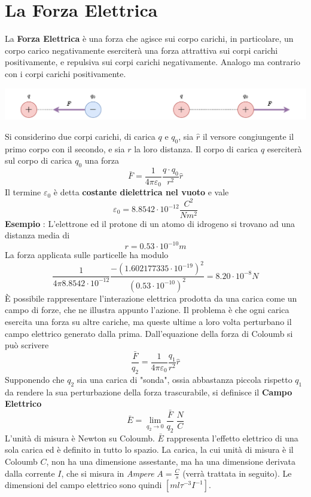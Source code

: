 \documentclass[10pt, letterpaper]{report}
\begin{document}
\section{La Forza Elettrica}
La \textbf{Forza Elettrica} è una forza che agisce sui corpo carichi, in particolare, un corpo carico negativamente eserciterà una forza attrattiva sui corpi carichi positivamente, e repulsiva sui corpi carichi negativamente. Analogo ma contrario con i corpi carichi positivamente.\begin{center}
    \includegraphics[width=1\textwidth ]{images/cariche.pdf}
\end{center}
Si considerino due corpi carichi, di carica $q$ e $q_0$, sia $\hat r$ il versore congiungente il primo corpo con il secondo, e sia $r$ la loro distanza. Il corpo di carica $q$ eserciterà sul corpo di carica $q_0$ una forza 
$$ \bar F = \frac{1}{4\pi\varepsilon_0}\frac{q\cdot q_0}{r^2}\hat r$$
Il termine $\varepsilon_0$ è detta \textbf{costante dielettrica nel vuoto} e vale 
$$ \varepsilon_0=8.8542\cdot10^{-12}\frac{C^2}{Nm^2}$$
\textbf{Esempio} : L'elettrone ed il protone di un atomo di idrogeno si trovano ad una distanza media di 
$$ r=0.53\cdot10^{-10}m$$
La forza applicata sulle particelle ha modulo 
$$ \frac{1}{4\pi8.8542\cdot10^{-12}}\frac{-(1.602177335\cdot10^{-19})^2}{(0.53\cdot10^{-10})^2}=8.20\cdot 10^{-8}N$$
È possibile rappresentare l'interazione elettrica prodotta da una carica come un campo di forze, che ne illustra appunto l'azione. Il problema è che ogni carica esercita una forza su altre cariche, ma queste ultime a loro volta perturbano il campo elettrico generato dalla prima. Dall'equazione della forza di Coloumb si può 
scrivere 
$$ \frac{\bar F}{q_2}=\frac{1}{4\pi\varepsilon_0}\frac{q_1}{r^2}\hat r$$
Supponendo che $q_2$ sia una carica di "sonda", ossia abbastanza piccola rispetto $q_1$ da rendere la sua perturbazione della forza trascurabile, si definisce il \textbf{Campo Elettrico}
$$ \bar E = \lim_{q_2\rightarrow 0}\frac{\bar F}{q_2} \ \frac{N}{C}$$
L'unità di misura è Newton su Coloumb. $\bar E$ rappresenta l'effetto elettrico di una sola carica ed è definito in tutto lo spazio. \acc 
La carica, la cui unità di misura è il Coloumb $C$, non ha una dimensione assestante, ma ha una dimensione derivata dalla corrente $I$, che si misura in \textit{Ampere} $A=\frac{C}{s}$ (verrà trattata in seguito).
Le dimensioni del campo elettrico sono quindi $[ml\tau^{-3}I^{-1}]$.\acc 
\end{document}
